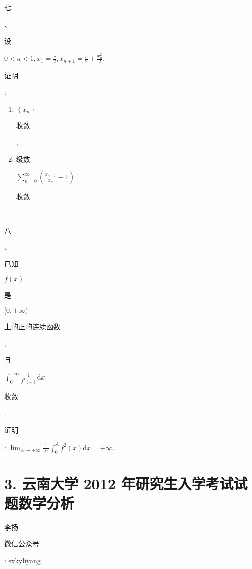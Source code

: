 \documentclass[10pt]{article}
\begin{document}
\begin{CJK}{UTF8}{mj}七\end{CJK}、\begin{CJK}{UTF8}{mj}设\end{CJK} $0<a<1, x_{1}=\frac{c}{2}, x_{n+1}=\frac{c}{2}+\frac{x_{n}^{2}}{2}$. \begin{CJK}{UTF8}{mj}证明\end{CJK}:

\begin{enumerate}
  \item $\left\{x_{n}\right\}$ \begin{CJK}{UTF8}{mj}收敛\end{CJK};

  \item \begin{CJK}{UTF8}{mj}级数\end{CJK} $\sum_{n=0}^{\infty}\left(\frac{x_{n+1}}{x_{n}}-1\right)$ \begin{CJK}{UTF8}{mj}收敛\end{CJK}.

\end{enumerate}
\begin{CJK}{UTF8}{mj}八\end{CJK}、\begin{CJK}{UTF8}{mj}已知\end{CJK} $f(x)$ \begin{CJK}{UTF8}{mj}是\end{CJK} $[0,+\infty)$ \begin{CJK}{UTF8}{mj}上的正的连续函数\end{CJK}, \begin{CJK}{UTF8}{mj}且\end{CJK} $\int_{0}^{+\infty} \frac{1}{f^{2}(x)} \mathrm{d} x$ \begin{CJK}{UTF8}{mj}收敛\end{CJK}. \begin{CJK}{UTF8}{mj}证明\end{CJK}: $\lim _{A \rightarrow+\infty} \frac{1}{A^{2}} \int_{0}^{A} f^{2}(x) \mathrm{d} x=+\infty$.

\section{3. 云南大学 2012 年研究生入学考试试题数学分析}
\begin{CJK}{UTF8}{mj}李扬\end{CJK}

\begin{CJK}{UTF8}{mj}微信公众号\end{CJK}: sxkyliyang
\end{document}
